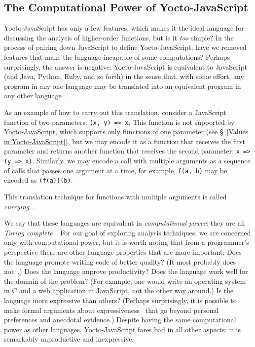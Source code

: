 \documentclass[12pt, oneside]{book}
\begin{document}
\begin{mdframed}[frametitle = {Advanced}]

\subsection{The Computational Power of Yocto-JavaScript}
\label{The Computational Power of Yocto-JavaScript}

Yocto-JavaScript has only a few features, which makes it the ideal language for discussing the analysis of higher-order functions, but is it \emph{too} simple? In the process of pairing down JavaScript to define Yocto-JavaScript, have we removed features that make the language incapable of some computations? Perhaps surprisingly, the answer is negative: Yocto-JavaScript is equivalent to JavaScript (and Java, Python, Ruby, and so forth) in the sense that, with some effort, any program in any one language may be translated into an equivalent program in any other language~\cite[§~6]{understanding-computation}.

As an example of how to carry out this translation, consider a JavaScript function of two parameters: \texttt{(x, y) => x}. This function is not supported by Yocto-JavaScript, which supports only functions of one parameter (see §~\ref{Values in Yocto-JavaScript}), but we may encode it as a function that receives the first parameter and returns another function that receives the second parameter: \texttt{x => (y => x)}. Similarly, we may encode a call with multiple arguments as a sequence of calls that passes one argument at a time, for example, \texttt{f(a, b)} may be encoded as \texttt{(f(a))(b)}.

\begin{mdframed}[frametitle = {Technical Terms}]
This translation technique for functions with multiple arguments is called \emph{currying}~\cite[page~163]{understanding-computation}.
\end{mdframed}


We say that these languages are equivalent in \emph{computational power}: they are all \emph{Turing complete}~\cite[§~7]{understanding-computation}. For our goal of exploring analysis techniques, we are concerned only with computational power, but it is worth noting that from a programmer’s perspective there are other language properties that are more important: Does the language promote writing code of better quality? (It most probably does not~\cite{code-quality}.) Does the language improve productivity? Does the language work well for the domain of the problem? (For example, one would write an operating system in C and a web application in JavaScript, not the other way around.) Is the language more expressive than others? (Perhaps surprisingly, it is possible to make formal arguments about expressiveness~\cite{expressive-power} that go beyond personal preferences and anecdotal evidence.) Despite having the same computational power as other languages, Yocto-JavaScript fares bad in all other aspects: it is remarkably unproductive and inexpressive.


\end{mdframed}
\end{document}
